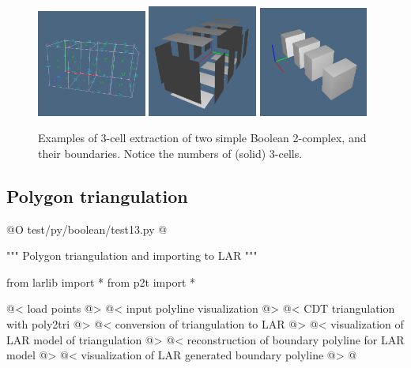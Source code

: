 \documentclass[11pt,oneside]{article}    %
\begin{document}
\begin{figure}[htbp]
   \includegraphics[height=0.332\textwidth,width=0.32\textwidth]{images/test11c1} 
   \includegraphics[height=0.332\textwidth,width=0.32\textwidth]{images/test11c2} 
   \includegraphics[height=0.332\textwidth,width=0.32\textwidth]{images/test11c3} 
   \caption{Examples of 3-cell extraction of two simple Boolean 2-complex, and their boundaries. Notice the numbers of (solid) 3-cells.}
   \label{fig:example}
\end{figure}


\subsection{Polygon triangulation}

@O test/py/boolean/test13.py
@{""" Polygon triangulation and importing to LAR """

from larlib import *
from p2t import *

@< load points @>
@< input polyline visualization @>
@< CDT triangulation with poly2tri @>
@< conversion of triangulation to LAR @>
@< visualization of LAR model of triangulation @>
@< reconstruction of boundary polyline for LAR model @>
@< visualization of LAR generated boundary polyline @>
@}
\end{document}
